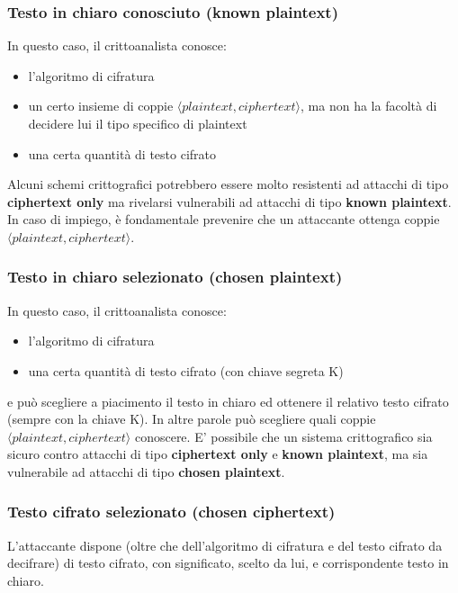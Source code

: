 \subsubsection{Testo in chiaro conosciuto (known plaintext)}
In questo caso, il crittoanalista conosce:
\begin{itemize} 
  \item l’algoritmo di cifratura
  \item un certo insieme di coppie $\langle plaintext, ciphertext \rangle$, ma non ha la facoltà di decidere lui il tipo specifico di plaintext
  \item una certa quantità di testo cifrato
\end{itemize}
Alcuni schemi crittografici potrebbero essere molto resistenti ad attacchi di tipo \textbf{ciphertext only} ma rivelarsi vulnerabili ad attacchi di tipo \textbf{known plaintext}. In caso di impiego, è fondamentale prevenire che un attaccante ottenga coppie $\langle plaintext, ciphertext \rangle$.

\subsubsection{Testo in chiaro selezionato (chosen plaintext)}
In questo caso, il crittoanalista conosce:
\begin{itemize} 
  \item l’algoritmo di cifratura
  \item una certa quantità di testo cifrato (con chiave segreta K)
\end{itemize}
e può scegliere a piacimento il testo in chiaro ed ottenere il relativo testo cifrato (sempre con la chiave K). In altre parole può scegliere quali coppie $\langle plaintext, ciphertext \rangle$ conoscere. E' possibile che un sistema crittografico sia sicuro contro attacchi di tipo \textbf{ciphertext only} e \textbf{known plaintext}, ma sia vulnerabile ad attacchi di tipo \textbf{chosen plaintext}.

\subsubsection{Testo cifrato selezionato (chosen ciphertext)}
L'attaccante dispone (oltre che dell'algoritmo di cifratura e del testo cifrato da decifrare) di testo cifrato, con significato, scelto da lui, e corrispondente testo in chiaro.
